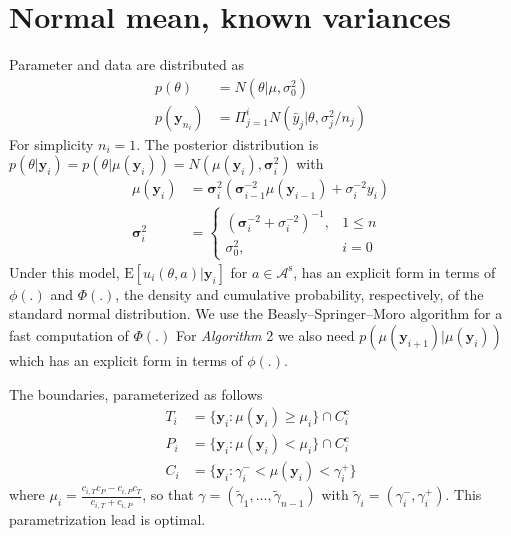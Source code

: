 \documentclass[11pt]{article}
\begin{document}
\section{Normal mean, known variances}
Parameter and data are distributed as
\begin{align}\label{normM_knownVar_prior}
p(\theta)&=N(\theta|\mu,\sigma_0^2)\\\label{norml_dta}
p(\mathbf{y}_{n_i})&=\Pi_{j=1}^{i} N(\bar{y}_j|\theta,\sigma_j^2/n_j)
\end{align}For simplicity $n_i=1$. The posterior distribution is $p(\theta|\mathbf{y}_i)=p(\theta|\mu(\mathbf{y}_i))= N(\mu(\mathbf{y}_i),\boldsymbol\sigma_i^2)$ with
\begin{align}
\mu(\mathbf{y}_i)&=\boldsymbol{\sigma}_i^2(\boldsymbol{\sigma}_{i-1}^{-2}\mu(\mathbf{y}_{i-1})+\sigma_i^{-2} y_i)\\
\boldsymbol\sigma_i^2&=\left \{
\begin{array}{ll}
(\boldsymbol\sigma_i^{-2}+\sigma_i^{-2})^{-1},& 1\leq n\\
\sigma_0^2,& i=0
\end{array}\right.
\end{align}
Under this model, $\mathrm{E}[u_i(\theta,a)|\mathbf{y}_i]$ for $a\in\mathcal{A}^{\mathrm{s}}$, has an explicit form in terms of $\phi(.)$ and $\Phi(.)$, the density and cumulative probability, respectively, of the standard normal distribution. We use the Beasly--Springer--Moro algorithm for a fast computation of $\Phi(.)$ 
For \textit{Algorithm} 2 we also need  $p(\mu(\mathbf{y}_{i+1})|\mu(\mathbf{y}_{i}))$ which has an explicit form in terms of $\phi(.)$.

The boundaries, parameterized as follows
\begin{align}\label{normM_knownVar_prior_T_i}
T_i &=\{\mathbf{y}_i:\mu(\mathbf{y}_i)\geq \mu_i\}\cap C_i^{\mathrm{c}}\\\label{normM_knownVar_prior_P_i}
P_i &=\{\mathbf{y}_i:\mu(\mathbf{y}_i)< \mu_i\}\cap C_i^{\mathrm{c}}\\\label{normM_knownVar_prior_C_i}
C_i &=\{\mathbf{y}_i:\gamma_i^{-}<\mu(\mathbf{y}_i)<\gamma_i^{+}\}
\end{align}where $\mu_i=\frac{c_{i,T} c_P-c_{i,P}c_T}{c_{i,T}+c_{i,P}}$, so that
$\gamma=(\tilde\gamma_1,...,\tilde\gamma_{n-1})$ with $\tilde\gamma_{i}=(\gamma_i^{-},\gamma_i^{+})$.
This parametrization lead is optimal. %
\end{document}
